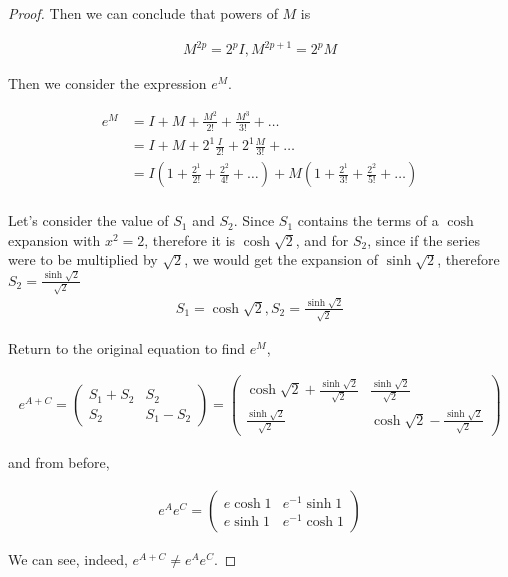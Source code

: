 \documentclass{article}
\begin{document}
\begin{proof}
Then we can conclude that powers of $M$ is 

\begin{align*}
M^{2p} = 2^p I, 
M^{2p+1} = 2^p M
\end{align*}

Then we consider the expression $e^{M}$. 

\begin{align*}
e^{M} &= I + M + \frac{M^2}{2!} + \frac{M^3}{3!} + \ldots \\ 
&= I + M + 2^1 \frac{I}{2!} + 2^1 \frac{M}{3!} + \ldots \\
&= I(1 + \frac{2^1}{2!} + \frac{2^2}{4!} + \ldots ) + M (1 + \frac{2^1}{3!} + \frac{2^2}{5!} + \ldots ) \\
\end{align*}

Let's consider the value of $S_1$ and $S_2$. Since $S_1$ contains the terms of a $\cosh$ expansion with $x^2 = 2$, therefore it is $\cosh \sqrt{2}$, and for $S_2$, since if the series were to be multiplied by $\sqrt{2}$, we would get the expansion of $\sinh \sqrt{2}$, therefore $S_2 = \frac{\sinh \sqrt{2}}{\sqrt{2}}$
\begin{align*}
S_1 = \cosh \sqrt{2}, S_2 = \frac{\sinh \sqrt{2}}{\sqrt{2}}
\end{align*}

Return to the original equation to find $e^M$, 

\begin{align*}
e^{A+C} = \begin{pmatrix}
S_1 + S_2 & S_2 \\ S_2 & S_1 - S_2
\end{pmatrix}
= \begin{pmatrix}
\cosh \sqrt{2} + \frac{\sinh \sqrt{2}}{\sqrt{2}} & \frac{\sinh \sqrt{2}}{\sqrt{2}} \\ \frac{\sinh \sqrt{2}}{\sqrt{2}} & \cosh \sqrt{2} - \frac{\sinh \sqrt{2}}{\sqrt{2}}
\end{pmatrix}
\end{align*}

and from before,

\begin{align*}
e^{A}e^{C} = \begin{pmatrix}
e \cosh 1 & e^{-1} \sinh 1 \\ e \sinh 1 & e^{-1} \cosh 1
\end{pmatrix}
\end{align*} 

We can see, indeed, $e^{A+C} \neq e^A e^C$.

\end{proof}
\end{document}
